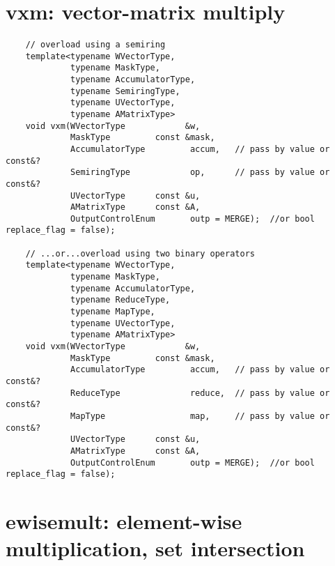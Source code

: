 \section{{\sf vxm}: vector-matrix multiply}

\paragraph{\syntax}

\begin{verbatim}
    // overload using a semiring
    template<typename WVectorType,
             typename MaskType,
             typename AccumulatorType,
             typename SemiringType,
             typename UVectorType,
             typename AMatrixType>
    void vxm(WVectorType            &w,
             MaskType         const &mask,
             AccumulatorType         accum,   // pass by value or const&?
             SemiringType            op,      // pass by value or const&?
             UVectorType      const &u,
             AMatrixType      const &A,
             OutputControlEnum       outp = MERGE);  //or bool replace_flag = false);

    // ...or...overload using two binary operators
    template<typename WVectorType,
             typename MaskType,
             typename AccumulatorType,
             typename ReduceType,
             typename MapType,
             typename UVectorType,
             typename AMatrixType>
    void vxm(WVectorType            &w,
             MaskType         const &mask,
             AccumulatorType         accum,   // pass by value or const&?
             ReduceType              reduce,  // pass by value or const&?
             MapType                 map,     // pass by value or const&?
             UVectorType      const &u,
             AMatrixType      const &A,
             OutputControlEnum       outp = MERGE);  //or bool replace_flag = false);
\end{verbatim}


\section{{\sf ewisemult}: element-wise multiplication, set intersection}

\paragraph{\syntax}

